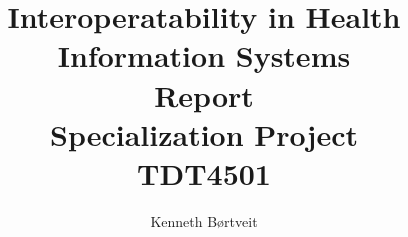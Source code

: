 \documentclass[10pt, a4paper]{report}
\title{{\Huge Interoperatability in Health Information Systems} \\ Report \\ Specialization Project \\ TDT4501}
\author{Kenneth Børtveit}
\begin{document}
\maketitle
\tableofcontents
\listoffigures
\listoftables
\printnomenclature
\begin{abstract}

\end{abstract}
 




\end{document}
